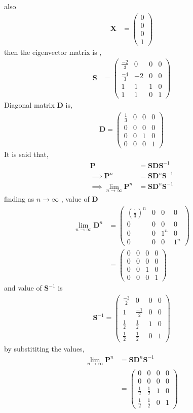 \documentclass[journal,12pt,two column]{IEEEtran}
\providecommand{\brak}[1]{\ensuremath{\left(#1\right)}}
\newcommand{\myvec}[1]{\ensuremath{\begin{pmatrix}#1\end{pmatrix}}}
\let\vec\mathbf
\begin{document}
also
\begin{align}
	\vec{X}&=\myvec{0\\0\\0\\1}
\end{align}
then the eigenvector matrix is ,
\begin{align}
	\vec{S}&=\myvec{\frac{-2}{3}&0&0&0\\
	\frac{-4}{3}&-2&0&0\\
	1&1&1&0\\
	1&1&0&1}
\end{align}
Diagonal matrix $\vec{D}$ is,
\begin{align}
	\vec{D}=\myvec{\frac{1}{3}&0&0&0\\
	0&0&0&0\\
	0&0&1&0\\
	0&0&0&1}
\end{align} 
It is said that,
\begin{align}
	\vec{P}&=\vec{S}\vec{D}\vec{S}^{-1}\\
	\implies \vec{P}^n&=\vec{S}\vec{D}^n \vec{S}^{-1}\\
	\implies \lim_{n \to \infty} \vec{P}^n&=\vec{S} \vec{D}^n \vec{S}^{-1}
\end{align}
finding as $n \to \infty$ , value of $\vec{D}$
\begin{align}
	\lim_{n \to \infty} \vec{D}^n&=\myvec{\brak{\frac{1}{3}}^n &0&0&0\\
	0&0&0&0\\
	0&0&1^n&0\\
	0&0&0&1^n}\\
	&=\myvec{0&0&0&0\\
	0&0&0&0\\
	0&0&1&0\\
	0&0&0&1}
\end{align}
and value of $\vec{S}^{-1}$ is 
\begin{align}
	\vec{S}^{-1}=\myvec{\frac{-3}{2}&0&0&0\\
	                     1&\frac{-1}{2}&0&0\\
	                     \frac{1}{2}&\frac{1}{2}&1&0\\
	                     \frac{1}{2}&\frac{1}{2}&0&1}
\end{align}
by substititing the values,
\begin{align}	
	\lim _{n \to \infty}\vec{P}^n&=\vec{S}\vec{D}^n \vec{S}^{-1}\\
	&=\myvec{0&0&0&0\\0&0&0&0\\\frac{1}{2}&\frac{1}{2}&1&0\\ \frac{1}{2}&\frac{1}{2} &0&1}
\end{align}
\end{document}
